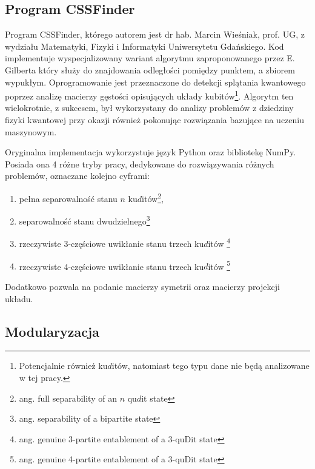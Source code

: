 \documentclass[11pt, a4paper]{article}
\begin{document}
\begin{sloppypar}
    \subsection{Program CSSFinder}


    Program CSSFinder, którego autorem jest dr hab. Marcin Wieśniak, prof. UG, z
    wydziału Matematyki, Fizyki i Informatyki Uniwersytetu Gdańskiego. Kod implementuje
    wyspecjalizowany wariant algorytmu zaproponowanego przez E. Gilberta\cite{Lindemann_Gilbert}
    który służy do znajdowania odległości pomiędzy punktem, a zbiorem wypukłym.
    Oprogramowanie jest przeznaczone do detekcji splątania kwantowego\cite{MW_Hilbert_Schmidt_distance}\cite{MW_Variational_approach}\cite{MW_Gilbert_Quantum_Entanglement}
    poprzez analizę macierzy gęstości opisujących układy kubitów\footnote{Potencjalnie
    również ku$d$itów, natomiast tego typu dane nie będą analizowane w tej pracy.}.
    Algorytm ten wielokrotnie, z sukcesem, był wykorzystany do analizy problemów z
    dziedziny fizyki kwantowej\cite{MW_Hilbert_Schmidt_distance} przy okazji również pokonując
    rozwiązania bazujące na uczeniu maszynowym\cite{MW_56_Year_Algorithm}.

    Oryginalna implementacja wykorzystuje język Python oraz bibliotekę NumPy. Posiada ona
    4 różne tryby pracy, dedykowane do rozwiązywania różnych problemów, oznaczane kolejno
    cyframi:

    \begin{enumerate}
      \item pełna separowalność stanu $n$ ku$d$itów\footnote{ang. full separability of an
        $n$ qu$d$it state},

      \item separowalność stanu dwudzielnego\footnote{ang. separability of a bipartite state}

      \item rzeczywiste 3-częściowe uwikłanie stanu trzech ku$d$itów \footnote{ang.
        genuine 3-partite entablement of a 3-quDit state}

      \item rzeczywiste 4-częściowe uwikłanie stanu trzech ku$d$itów \footnote{ang.
        genuine 4-partite entablement of a 3-quDit state}
    \end{enumerate}

    Dodatkowo pozwala na podanie macierzy symetrii oraz macierzy projekcji układu.

    \subsection{Modularyzacja}



\end{sloppypar}
\end{document}
